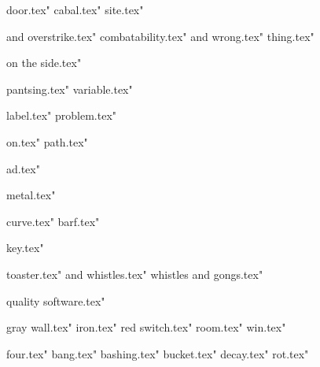 

 door.tex"
 cabal.tex"
 site.tex"




 and overstrike.tex"
 combatability.tex"
 and wrong.tex"
 thing.tex"

 on the side.tex"


 pantsing.tex"
 variable.tex"

 label.tex"
 problem.tex"

 on.tex"
 path.tex"

 ad.tex"


 metal.tex"










 curve.tex"
 barf.tex"







 key.tex"


 toaster.tex"
 and whistles.tex"
 whistles and gongs.tex"

 quality software.tex"








 gray wall.tex"
 iron.tex"
 red switch.tex"
 room.tex"
 win.tex"



 four.tex"
 bang.tex"
 bashing.tex"
 bucket.tex"
 decay.tex"
 rot.tex"
